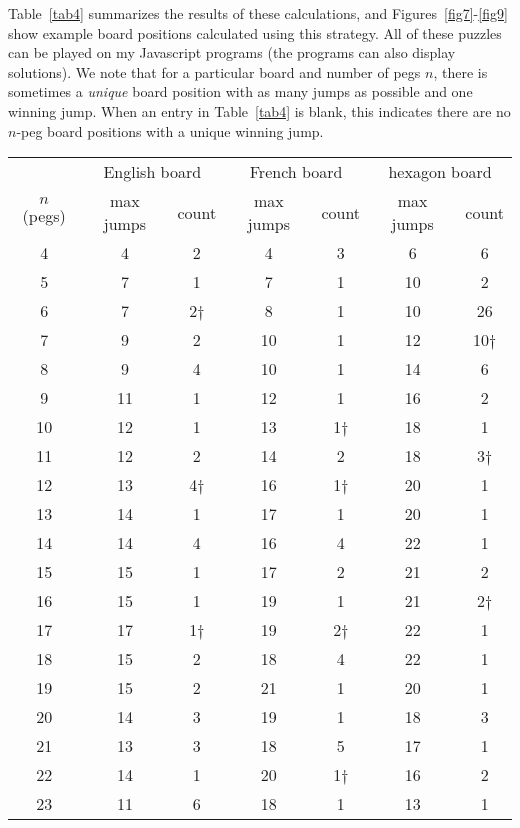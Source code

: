 \documentclass[12pt,reqno]{article}
\begin{document}
Table~\ref{tab4} summarizes the results of these calculations,
and Figures~\ref{fig7}-\ref{fig9} show example board positions calculated using this strategy.
All of these puzzles can be played on my Javascript programs \cite{BellDifEng,BellDifFr,BellDifHex}
(the programs can also display solutions).
We note that for a particular board and number of pegs $n$,
there is sometimes a \textit{unique} board position with as many jumps as possible and one winning jump.
When an entry in Table~\ref{tab4} is blank,
this indicates there are no $n$-peg board positions with a unique winning jump.

\begin{table}[!t]
\begin{center} 
\begin{tabular}{ c | c  c | c  c | c  c}
 & \multicolumn{2}{|c|}{English board} & \multicolumn{2}{|c|}{French board} & \multicolumn{2}{|c}{hexagon board}\\
$n$ (pegs) & max jumps & count & max jumps & count & max jumps & count\\
\hline
4 & 4 & 2 & 4 & 3 & 6 & 6\\ 
5 & 7 & 1 & 7 & 1 & 10 & 2\\
6 & 7 & 2$\dagger$ & 8 & 1 & 10 & 26\\
7 & 9 & 2 & 10 & 1 & 12 & 10$\dagger$\\
8 & 9 & 4 & 10 & 1 & 14 & 6\\
9 & 11 & 1 & 12 & 1 & 16 & 2\\
10 & 12 & 1 & 13 & 1$\dagger$ & 18 & 1\\
11 & 12 & 2 & 14 & 2 & 18 & 3$\dagger$\\
12 & 13 & 4$\dagger$ & 16 & 1$\dagger$ & 20 & 1\\
13 & 14 & 1 & 17 & 1 & 20 & 1\\
14 & 14 & 4 & 16 & 4 & 22 & 1\\
15 & 15 & 1 & 17 & 2 & 21 & 2\\
16 & 15 & 1 & 19 & 1 & 21 & 2$\dagger$\\
17 & 17 & 1$\dagger$ & 19 & 2$\dagger$ & 22 & 1\\
18 & 15 & 2 & 18 & 4 & 22 & 1\\
19 & 15 & 2 & 21 & 1 & 20 & 1\\
20 & 14 & 3 & 19 & 1 & 18 & 3\\
21 & 13 & 3 & 18 & 5 & 17 & 1\\
22 & 14 & 1 & 20 & 1$\dagger$ & 16 & 2\\
23 & 11 & 6 & 18 & 1 & 13 & 1\\

\end{tabular}
\end{center}
\end{table}
\end{document}
